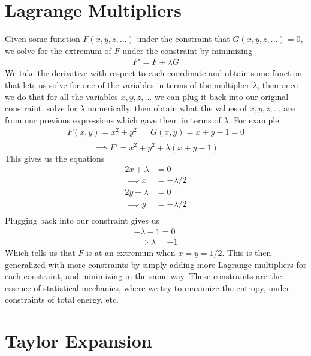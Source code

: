 



\section{Lagrange Multipliers}\label{lagrange-mult}
Given some function $F(x,y,z,...)$ under the constraint that $G(x,y,z,...) = 0$, we solve for the extremum of $F$ under the constraint by minimizing 
\begin{align}
F' = F + \lambda G
\end{align}
We take the derivative with respect to each coordinate and obtain some function that lets us solve for one of the variables in terms of the multiplier $\lambda$, then once we do that for all the variables $x,y,z,...$ we can plug it back into our original constraint, solve for $\lambda$ numerically, then obtain what the values of $x,y,z,...$ are from our previous expressions which gave them in terms of $\lambda$. For example
\begin{align}
F(x,y) = x^2 + y^2 && G(x,y) = x + y -1 = 0\\
\end{align}
$$\implies F' = x^2 + y^2 + \lambda(x+y-1)$$
This gives us the equations
\begin{align}
2x + \lambda &= 0\\
\implies x &= -\lambda/2\\
2y + \lambda &= 0\\
\implies y &=-\lambda/2\\
\end{align}
Plugging back into our constraint gives us
\begin{align}
-\lambda - 1 = 0\\
\implies \lambda = -1
\end{align}
Which tells us that $F$ is at an extremum when $x = y = 1/2$. This is then generalized with more constraints by simply adding more Lagrange multipliers for each constraint, and minimizing in the same way. These constraints are the essence of statistical mechanics, where we try to maximize the entropy, under constraints of total energy, etc.


\section{Taylor Expansion}


